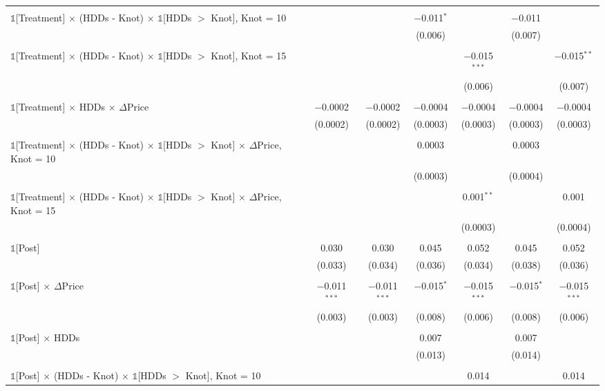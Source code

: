 \begin{table}[!htbp]
\begin{tabular}{@{\extracolsep{20pt}}lcccccc}
  & & & & & & \\ 
 $\mathbb{1}$[Treatment] $\times$ (HDDs - Knot) $\times$ $\mathbb{1}$[HDDs $>$ Knot],  Knot = 10 &  &  & $-$0.011$^{*}$ &  & $-$0.011 &  \\ 
  &  &  & (0.006) &  & (0.007) &  \\ 
  & & & & & & \\ 
 $\mathbb{1}$[Treatment] $\times$ (HDDs - Knot) $\times$ $\mathbb{1}$[HDDs $>$ Knot],  Knot = 15 &  &  &  & $-$0.015$^{***}$ &  & $-$0.015$^{**}$ \\ 
  &  &  &  & (0.006) &  & (0.007) \\ 
  & & & & & & \\ 
 $\mathbb{1}$[Treatment] $\times$ HDDs $\times$ $\Delta$Price & $-$0.0002 & $-$0.0002 & $-$0.0004 & $-$0.0004 & $-$0.0004 & $-$0.0004 \\ 
  & (0.0002) & (0.0002) & (0.0003) & (0.0003) & (0.0003) & (0.0003) \\ 
  & & & & & & \\ 
 $\mathbb{1}$[Treatment] $\times$ (HDDs - Knot) $\times$ $\mathbb{1}$[HDDs $>$ Knot] $\times$ $\Delta$Price,  Knot = 10 &  &  & 0.0003 &  & 0.0003 &  \\ 
  &  &  & (0.0003) &  & (0.0004) &  \\ 
  & & & & & & \\ 
 $\mathbb{1}$[Treatment] $\times$ (HDDs - Knot) $\times$ $\mathbb{1}$[HDDs $>$ Knot] $\times$ $\Delta$Price,  Knot = 15 &  &  &  & 0.001$^{**}$ &  & 0.001 \\ 
  &  &  &  & (0.0003) &  & (0.0004) \\ 
  & & & & & & \\ 
 $\mathbb{1}$[Post] & 0.030 & 0.030 & 0.045 & 0.052 & 0.045 & 0.052 \\ 
  & (0.033) & (0.034) & (0.036) & (0.034) & (0.038) & (0.036) \\ 
  & & & & & & \\ 
 $\mathbb{1}$[Post] $\times$ $\Delta$Price & $-$0.011$^{***}$ & $-$0.011$^{***}$ & $-$0.015$^{*}$ & $-$0.015$^{***}$ & $-$0.015$^{*}$ & $-$0.015$^{***}$ \\ 
  & (0.003) & (0.003) & (0.008) & (0.006) & (0.008) & (0.006) \\ 
  & & & & & & \\ 
 $\mathbb{1}$[Post] $\times$ HDDs &  &  & 0.007 &  & 0.007 &  \\ 
  &  &  & (0.013) &  & (0.014) &  \\ 
  & & & & & & \\ 
 $\mathbb{1}$[Post] $\times$ (HDDs - Knot) $\times$ $\mathbb{1}$[HDDs $>$ Knot],  Knot = 10 &  &  &  & 0.014 &  & 0.014 \\ 

\end{tabular}
\end{table}
